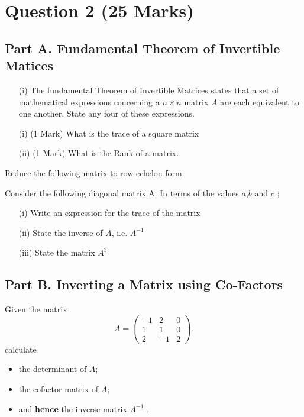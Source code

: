 \documentclass[12pt,a4paper]{article}
\begin{document}
	\section*{Question 2 (25 Marks)}
	
	\subsection*{Part A. Fundamental Theorem of Invertible Matices}
	\begin{itemize}
		\item[(i)] The fundamental Theorem of Invertible Matrices states that a set of mathematical expressions concerning a $n\times n$ matrix $A$ are each equivalent to one another.
		State any four of these expressions.
		\item[(i)] (1 Mark) What is the trace of a square matrix
		\item[(ii)] (1 Mark) What is the Rank of a matrix.
	\end{itemize}
	
	
	Reduce the following matrix to row echelon form
	
	
	Consider the following diagonal matrix A. In terms of the values $a$,$b$ and $c$ ;
	\begin{itemize}
		\item[(i)] Write an expression for the trace of the matrix
		\item[(ii)] State the inverse of $A$, i.e. $A^{-1}$
		\item[(iii)] State the matrix $A^3$
	\end{itemize}

	
\subsection*{Part B. Inverting a Matrix using Co-Factors}
	
	
	
	
	Given the  matrix 
	\begin{equation*}
	A=\left( \begin{array}{rrr}
	-1 & 2 & 0\\
	1 & 1 & 0\\
	2 & -1 & 2
	\end{array} \right).
	\end{equation*}
	calculate
	\begin{itemize}
		\item the determinant of $A$;
		\item the cofactor matrix of $A$;
		\item and {\bf hence} the inverse matrix $A^{-1}$ .
	\end{itemize}
	
\end{document}

